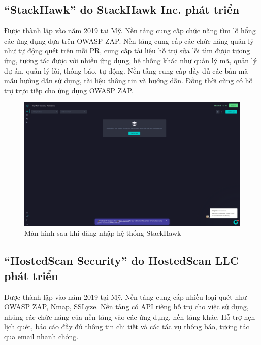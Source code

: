 \newpage
\subsection{“StackHawk” do StackHawk Inc. phát triển}

\tab Được thành lập vào năm 2019 tại Mỹ.
Nền tảng cung cấp chức năng tìm lỗ hổng các ứng dụng dựa trên OWASP ZAP.
Nền tảng cung cấp các chức năng quản lý như tự động quét trên mỗi PR, cung cấp tài liệu hỗ trợ sửa lỗi tìm được tương ứng, tương tác được với nhiều ứng dụng, hệ thống khác như quản lý mã, quản lý dự án, quản lý lỗi, thông báo, tự động.
Nền tảng cung cấp đầy đủ các bản mã mẫu hướng dẫn sử dụng, tài liệu thông tin và hướng dẫn.
Đồng thời cũng có hỗ trợ trực tiếp cho ứng dụng OWASP ZAP.

\begin{figure}[H]
    \centering
    \includegraphics[width=\textwidth]{applied-thesis-chapters/chapter-1/app.stackhawk.com_applications.png}
    \caption{Màn hình sau khi đăng nhập hệ thống StackHawk}
\end{figure}

\newpage
\subsection{“HostedScan Security” do HostedScan LLC phát triển}

\tab Được thành lập vào năm 2019 tại Mỹ.
Nền tảng cung cấp nhiều loại quét như OWASP ZAP, Nmap, SSLyze.
Nền tảng có API riêng hỗ trợ cho việc sử dụng, nhúng các chức năng của nền tảng vào các ứng dụng, nền tảng khác.
Hỗ trợ hẹn lịch quét, báo cáo đầy đủ thông tin chi tiết và các tác vụ thông báo, tương tác qua email nhanh chóng.

